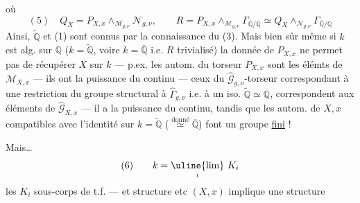 où
\[
(5)\quad Q_X=P_{X,x}\wedge_{\mathcal M_{g,\nu}}\mathcal N_{g,\nu},\qquad
R=P_{X,x}\wedge_{\mathcal M_{g,\nu}}\Gamma_{\overline{\mathbb Q}/\mathbb Q}
\simeq Q_X\wedge_{\mathcal N_{g,\nu}}\Gamma_{\overline{\mathbb Q}/\mathbb Q}
\]
Ainsi, $\widetilde{\mathbb Q}$ et (1) sont connus par la connaissance du
 (3). Mais bien sûr même si
$k$ est alg. sur $\mathbb Q$ ($k=\widetilde{\mathbb Q}$, voire $k=\overline{\mathbb Q}$
i.e.  $R$ trivialisé) la donnée de  $P_{X,x}$
ne permet pas de récupérer $X$ sur $k$ --- p.ex. les autom. du torseur $P_{X,x}$
sont les élémts de $\mathcal M_{X,x}$ --- ils ont la puissance du continu ---
ceux du  $\widehat{\mathcal G}_{g,\nu}$-torseur correspondant
à une restriction du groupe structural à $\widehat\Gamma_{g,\nu}$ i.e. à
un iso. $\widetilde{\mathbb Q}\simeq\overline{\mathbb Q}$, correspondent aux
éléments de $\widehat{\mathcal G}_{X,x}$ --- il a la puissance du continu,
tandis que les autom. de $X,x$ compatibles avec l'identité sur
$k=\widetilde{\mathbb Q}$ ($\overset{\mathrm{donné}}\simeq\overline{\mathbb Q}$)
font un groupe \uline{fini} !

Mais\ldots
\[
(6)\qquad k=\underset{i}{\uline{\lim}}\ K_i
\]
les $K_i$ sous-corps de t.f. --- et 
structure etc $(X,x)$ implique une structure
